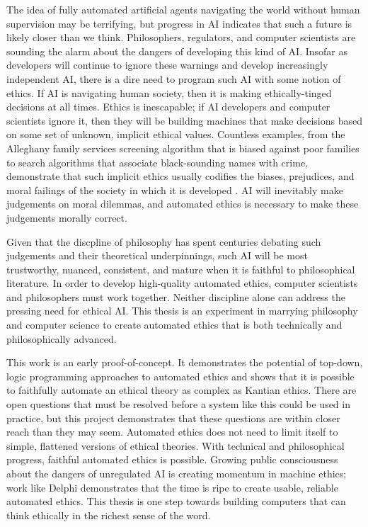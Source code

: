 \begin{isabellebody}
\begin{isamarkuptext}
The idea of fully automated artificial agents navigating the world without human supervision
may be terrifying, but progress in AI indicates that such a future is likely closer than we think. 
Philosophers, regulators, and computer scientists are sounding the alarm about the dangers of developing
this kind of AI. Insofar as developers will continue to ignore these warnings and develop increasingly 
independent AI, there is a dire need to program such AI with some notion of ethics. If AI is navigating
human society, then it is making ethically-tinged decisions at all times. Ethics is inescapable; 
if AI developers and computer scientists ignore it, then they will be building machines that make decisions
based on some set of unknown, implicit ethical values. Countless examples, from the Alleghany family services screening
algorithm that is biased against poor families to search algorithms that associate black-sounding names
with crime, demonstrate that such implicit ethics usually codifies the biases, prejudices, and moral
failings of the society in which it is developed \citep{eubanks, sweeney}. AI will inevitably make judgements on moral dilemmas, 
and automated ethics is necessary to make these judgements morally correct. 

Given that the discpline of philosophy has spent centuries debating such judgements and their theoretical 
underpinnings, such AI will be most trustworthy, nuanced, consistent, and mature when it is faithful to 
philosophical literature. In order to develop high-quality automated ethics, computer scientists and 
philosophers must work together. Neither discipline alone can address the pressing need for ethical AI. 
This thesis is an experiment in marrying philosophy and computer science 
to create automated ethics that is both technically and philosophically advanced. 

This work is an early proof-of-concept. It demonstrates the potential of top-down, logic programming 
approaches to automated ethics and shows that it is possible to faithfully automate an ethical theory as
complex as Kantian ethics. There are open questions that must be resolved before a system like this 
could be used in practice, but this project demonstrates that these questions are within closer reach
than they may seem. Automated ethics does not need to limit itself to simple, flattened versions of 
ethical theories. With technical and philosophical progress, faithful automated ethics is possible.
Growing public consciousness about the dangers of unregulated AI is creating momentum in machine ethics; 
work like Delphi demonstrates that the time is ripe to create usable, reliable automated ethics. This 
thesis is one step towards building computers that can think ethically in the richest sense of the word.%
\end{isamarkuptext}\isamarkuptrue%
%
\isadelimtheory
%
\endisadelimtheory
%
\isatagtheory
%
\endisatagtheory
{\isafoldtheory}%
%
\isadelimtheory
%
\endisadelimtheory
%
\end{isabellebody}%
